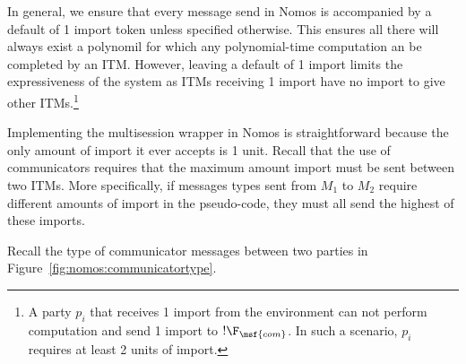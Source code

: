 In general, we ensure that every message send in Nomos is accompanied by a default of 1 import token unless specified otherwise.
This ensures all there will always exist a polynomil for which any polynomial-time computation an be completed by an ITM.
However, leaving a default of 1 import limits the expressiveness of the system as ITMs receiving 1 import have no import to give other ITMs.\footnote{A party $p_i$ that receives 1 import from the environment can not perform computation and send 1 import to $!\F_{\msf{com}}$. In such a scenario, $p_i$ requires at least 2 units of import.}


Implementing the multisession wrapper in Nomos is straightforward because the only amount of import it ever accepts is 1 unit.
Recall that the use of communicators requires that the maximum amount import must be sent between two ITMs.
More specifically, if messages types sent from $M_1$ to $M_2$ require different amounts of import in the pseudo-code, they must all send the highest of these imports.

Recall the type of communicator messages between two parties in Figure~\ref{fig:nomos:communicatortype}. 


